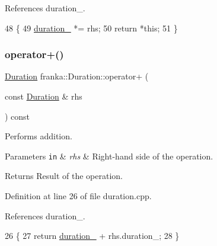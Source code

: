 References duration\+\_\+.


\begin{DoxyCode}
48                                                     \{
49   \hyperlink{classfranka_1_1Duration_ae446c403b200f0dbf92fb51ca21e82ff}{duration\_} *= rhs;
50   \textcolor{keywordflow}{return} *\textcolor{keyword}{this};
51 \}
\end{DoxyCode}
\mbox{\label{classfranka_1_1Duration_adb459e7bf5c6b02f9e72c808f5f30237}} 
\subsubsection{\texorpdfstring{operator+()}{operator+()}}
{\footnotesize\ttfamily \hyperlink{classfranka_1_1Duration}{Duration} franka\+::\+Duration\+::operator+ (\begin{DoxyParamCaption}\item[{const \hyperlink{classfranka_1_1Duration}{Duration} \&}]{rhs }\end{DoxyParamCaption}) const\hspace{0.3cm}{\ttfamily [noexcept]}}

Performs addition.


\begin{DoxyParams}[1]{Parameters}
\mbox{\tt in}  & {\em rhs} & Right-\/hand side of the operation.\\
\hline
\end{DoxyParams}
\begin{DoxyReturn}{Returns}
Result of the operation. 
\end{DoxyReturn}


Definition at line 26 of file duration.\+cpp.



References duration\+\_\+.


\begin{DoxyCode}
26                                                                \{
27   \textcolor{keywordflow}{return} \hyperlink{classfranka_1_1Duration_ae446c403b200f0dbf92fb51ca21e82ff}{duration\_} + rhs.duration\_;
28 \}
\end{DoxyCode}
\mbox{\label{classfranka_1_1Duration_a9ba66e248b6ad33bb51f43cdcfe98479}} 

